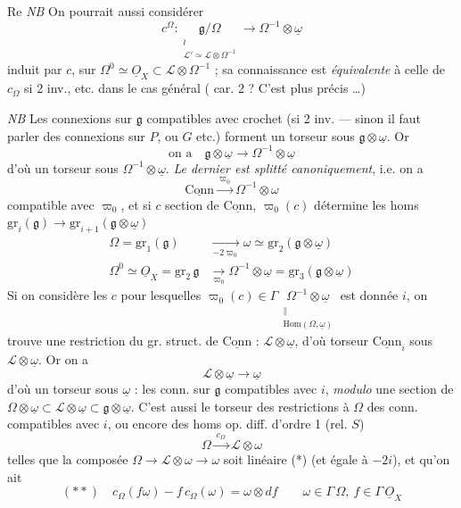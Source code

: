 \documentclass[11pt,a4paper]{article}
\begin{document}
\struck{\ill{}}

Re \emph{NB} On pourrait aussi considérer
\[
c^{\Omega} : \underset{\substack{\wr\\ \mathcal{L}'\simeq\mathcal{L}\otimes\Omega^{-1}}}{\mathfrak{g}/\Omega} \longrightarrow \Omega^{-1}\otimes\underline{\omega}
\]
induit par $c$, \ill{}  sur $\Omega^0 \simeq \underline{O}_X \subset \mathcal{L}\otimes\Omega^{-1}$ ; sa connaissance est \emph{équivalente} à celle de $c_{\Omega}$ si 2 inv., etc. dans le cas général ( car. 2 ? C'est  plus précis \ldots)

\emph{NB} Les connexions sur $\mathfrak{g}$ compatibles avec crochet \struck{\ill{}} (si 2 inv. --- sinon il faut parler des connexions sur $P$, ou $G$ etc.) forment un torseur sous $\mathfrak{g}\otimes\underline{\omega}$. Or
\[
\text{on a}\quad \mathfrak{g}\otimes\underline{\omega} \to \Omega^{-1}\otimes\underline{\omega}
\]
d'où un torseur sous $\Omega^{-1}\otimes\underline{\omega}$. \emph{Le dernier est splitté canoniquement}, i.e. on a
\[
\underline{\mathrm{Conn}} \xrightarrow{\ \varpi_0\ } \Omega^{-1}\otimes\omega
\]
compatible avec $\varpi_0$, et si $c$ section de $\underline{\mathrm{Conn}}$, $\varpi_0(c)$ détermine les homs $\mathrm{gr}_i(\mathfrak{g}) \to \mathrm{gr}_{i+1}(\mathfrak{g}\otimes\underline{\omega})$
\[
\begin{aligned}
\Omega = \mathrm{gr}_1(\mathfrak{g}) &\xrightarrow[-2\varpi_0]{} \omega \simeq \mathrm{gr}_2(\mathfrak{g}\otimes\underline{\omega})\\
\Omega^0 \simeq \underline{O}_X = \mathrm{gr}_2\,\mathfrak{g} &\xrightarrow[\varpi_0]{} \Omega^{-1}\otimes\underline{\omega} = \mathrm{gr}_3(\mathfrak{g}\otimes\underline{\omega})
\end{aligned}
\]
Si on considère les $c$ pour lesquelles $\varpi_0(c) \in \Gamma\,\underset{\substack{\|\\ \mathrm{Hom}(\Omega,\underline{\omega})}}{\Omega^{-1}\otimes\underline{\omega}}$ est donnée $i$, on trouve une restriction du gr. struct. de $\underline{\mathrm{Conn}}$ : $\mathcal{L}\otimes\underline{\omega}$, d'où torseur $\underline{\mathrm{Conn}}_i$ sous $\mathcal{L}\otimes\underline{\omega}$. Or on a
\[
\mathcal{L}\otimes\underline{\omega} \to \underline{\omega}
\]
d'où un torseur  sous $\underline{\omega}$ : les conn. sur $\mathfrak{g}$ compatibles avec $i$, \emph{modulo}   une section de $\Omega\otimes\underline{\omega} \subset \mathcal{L}\otimes\underline{\omega} \subset \mathfrak{g}\otimes\underline{\omega}$. C'est aussi \struck{(\ill{})} le torseur des restrictions à $\Omega$ des conn. compatibles avec $i$, ou encore des homs  op. diff. d'ordre 1 (rel. $S$)
\[
\Omega \xrightarrow{\ c_{\Omega}\ } \mathcal{L}\otimes\omega
\]
telles que la composée \struck{\ill{}} $\Omega \to \mathcal{L}\otimes\omega \to \omega$ soit linéaire (*) (et égale à $-2i$), et qu'on ait
\[
(**)\quad c_{\Omega}(f\omega) - f\,c_{\Omega}(\omega) = \omega\otimes df \qquad \omega\in\Gamma\,\Omega,\ f\in\Gamma\,\underline{O}_X
\]
\end{document}
